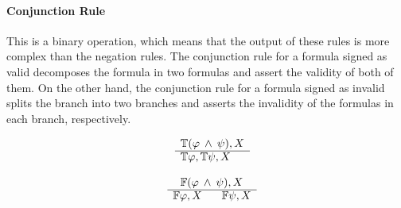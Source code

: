 \documentclass{article}
\newcommand{\signT}{\mathbb{T}}
\newcommand{\signF}{\mathbb{F}}
\begin{document}
		\paragraph{Conjunction Rule}
This is a binary operation, which means that the output of these rules is more complex than the negation rules.
The conjunction rule for a formula signed as valid decomposes the formula in two formulas and assert the validity of both of them.
On the other hand, the conjunction rule for a formula signed as invalid splits the branch into two branches and asserts the invalidity of the formulas in each branch, respectively.
		\newline
		\noindent\begin{minipage}{.5\linewidth}
		\begin{align*}
			\begin{array}{rl}
				& \signT(\varphi \: \wedge \: \psi), X \\
			      \cline{2-2}
			      & \signT\varphi, \signT\psi, X
			\end{array}
		\end{align*}
		\end{minipage}%
		\begin{minipage}{.5\linewidth}
		\begin{align*}
			\begin{array}{rl}
				& \:\:\: \signF(\varphi \: \wedge \: \psi), X \\
			      \cline{2-2}
			      & \signF\varphi, X \:\:\:\:\:\:\:\: \signF\psi, X
			\end{array}
		\end{align*}
		\end{minipage}
\end{document}
